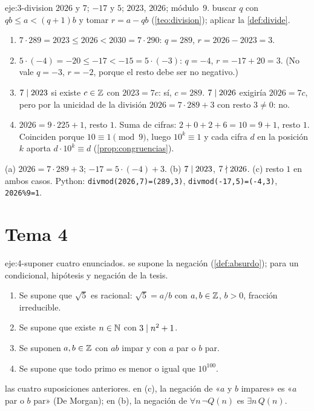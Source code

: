 \begin{solucion}{eje:3-division}
\datos $2026$ y $7$; $-17$ y $5$; $2023$, $2026$; módulo~9.
\planteamiento buscar $q$ con $qb\le a<(q+1)b$ y tomar $r=a-qb$ (\cref{teo:division}); aplicar la \cref{def:divide}.
\pasos
\begin{enumerate}[label=\arabic*.]
  \item $7\cdot 289=2023\le 2026<2030=7\cdot 290$: $q=289$, $r=2026-2023=3$.
  \item $5\cdot(-4)=-20\le -17<-15=5\cdot(-3)$: $q=-4$, $r=-17+20=3$. (No vale $q=-3$, $r=-2$, porque el resto debe ser no negativo.)
  \item $7\mid 2023$ si existe $c\in\mathbb{Z}$ con $2023=7c$: sí, $c=289$. $7\mid 2026$ exigiría $2026=7c$, pero por la unicidad de la división $2026=7\cdot 289+3$ con resto $3\neq 0$: no.
  \item $2026=9\cdot 225+1$, resto $1$. Suma de cifras: $2+0+2+6=10=9+1$, resto $1$. Coinciden porque $10\equiv 1\pmod 9$, luego $10^{k}\equiv 1$ y cada cifra $d$ en la posición $k$ aporta $d\cdot 10^{k}\equiv d$ (\cref{prop:congruencias}).
\end{enumerate}
\resultado (a) $2026=7\cdot 289+3$; $-17=5\cdot(-4)+3$. (b) $7\mid 2023$, $7\nmid 2026$. (c) resto $1$ en ambos casos.
\comprobacion Python: \texttt{divmod(2026,7)=(289,3)}, \texttt{divmod(-17,5)=(-4,3)}, \texttt{2026\%9=1}.
\end{solucion}

\section{Tema 4}

\begin{solucion}{eje:4-suponer}
\datos cuatro enunciados.
\planteamiento se supone la negación (\cref{def:absurdo}); para un condicional, hipótesis y negación de la tesis.
\pasos
\begin{enumerate}[label=(\alph*)]
  \item Se supone que $\sqrt5$ es racional: $\sqrt5=a/b$ con $a,b\in\mathbb{Z}$, $b>0$, fracción irreducible.
  \item Se supone que existe $n\in\mathbb{N}$ con $3\mid n^{2}+1$.
  \item Se suponen $a,b\in\mathbb{Z}$ con $ab$ impar y con $a$ par o $b$ par.
  \item Se supone que todo primo es menor o igual que $10^{100}$.
\end{enumerate}
\resultado las cuatro suposiciones anteriores.
\comprobacion en (c), la negación de «$a$ y $b$ impares» es «$a$ par o $b$ par» (De Morgan); en (b), la negación de $\forall n\,\neg Q(n)$ es $\exists n\,Q(n)$.
\end{solucion}


